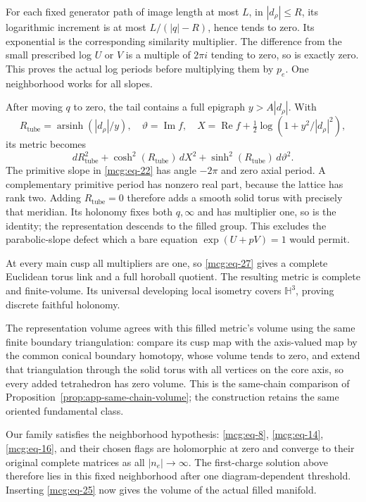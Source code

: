 For each fixed generator path of image length at most \(L\), in
\(|d_\rho|\le R\), its logarithmic increment is at most \(L/(|q|-R)\),
hence tends to zero. Its exponential is the corresponding similarity
multiplier. The difference from the small prescribed log \(U\) or \(V\)
is a multiple of \(2\pi i\) tending to zero, so is exactly zero. This
proves the actual log periods before multiplying them by
\(p_e\). One neighborhood works for all slopes.

After moving \(q\) to zero, the tail contains a full epigraph
\(y>A|d_\rho|\). With \[
 R_{\mathrm{tube}}=\operatorname{arsinh}(|d_\rho|/y),\quad
 \vartheta=\operatorname{Im}f,\quad
 X=\operatorname{Re}f+\tfrac12\log(1+y^2/|d_\rho|^2),
\] its metric becomes \begin{equation}\label{mcg:eq-28}
dR_{\mathrm{tube}}^2+\cosh^2(R_{\mathrm{tube}})\,dX^2
                   +\sinh^2(R_{\mathrm{tube}})\,d\vartheta^2 .
\end{equation} The primitive slope in \eqref{mcg:eq-22} has angle \(-2\pi\) and zero
axial period. A complementary primitive period has nonzero real part,
because the lattice has rank two. Adding \(R_{\mathrm{tube}}=0\)
therefore adds a smooth solid torus with precisely that meridian. Its
holonomy fixes both \(q,\infty\) and has multiplier one, so is the
identity; the representation descends to the filled group. This excludes
the parabolic-slope defect which a bare equation \(\exp(U+pV)=1\) would
permit.

At every main cusp all multipliers are one, so \eqref{mcg:eq-27} gives a
complete Euclidean torus link and a full horoball quotient. The
resulting metric is complete and finite-volume. Its universal developing
local isometry covers \(\mathbb H^3\), proving discrete faithful
holonomy.

The representation volume agrees with this filled metric's volume using
the same finite boundary triangulation: compare its cusp map with the
axis-valued map by the common conical boundary homotopy, whose volume
tends to zero, and extend that triangulation through the solid torus
with all vertices on the core axis, so every added tetrahedron has zero
volume. This is the same-chain comparison of
Proposition~\ref{prop:app-same-chain-volume}; the construction retains
the same oriented fundamental class.

Our family satisfies the neighborhood hypothesis: \eqref{mcg:eq-8},
\eqref{mcg:eq-14}, \eqref{mcg:eq-16}, and their chosen flags are
holomorphic at zero and converge to their original complete matrices as
all \(|n_e|\to\infty\). The first-charge solution above therefore lies
in this fixed neighborhood after one diagram-dependent threshold.
Inserting \eqref{mcg:eq-25} now gives the volume of the actual filled
manifold.

